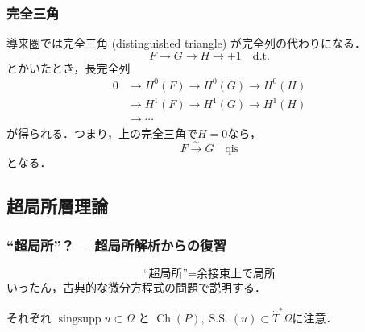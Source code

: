 \documentclass[dvipdfmx,10pt,aspectratio=169,leqno]{beamer}%
\newcommand{\rr}{\mathbf{R}}
\numberwithin{equation}{subsection}
\newcommand{\simarr}{\mathrel{\overset{\sim}{\longrightarrow}}}%
\newcommand{\cotb}[1][]{T^{\ast}{#1}}
\newcommand{\cotz}[1][]{T^{\ast}_{#1}{#1}}
\newcommand{\cotn}[1][]{\dot{T}^{\ast}{#1}}
\theoremstyle{mystyle}
\begin{document}
\begin{frame}
    \frametitle{完全三角}
    導来圏では完全三角 (distinguished triangle) が完全列の代わりになる．
    \[
        F\to G\to H\to+1\quad\mathrm{d.t.}
    \]
    とかいたとき，長完全列
    \begin{align*}
        0&\to H^0(F)\to H^0(G)\to H^0(H)\\
        &\to H^1(F)\to H^1(G)\to H^1(H)\\
        &\to \cdots
    \end{align*}
    が得られる．つまり，上の完全三角で\(H=0\)なら，
    \[
    F\simarr G\quad \mathrm{qis}
    \]となる．
\end{frame}

\subsection{超局所層理論}
\newcommand{\Char}{\mathop{\mathrm{Ch}}\nolimits}
\newcommand{\singsupp}{\mathop{\mathrm{singsupp}}\nolimits}
\newcommand{\SingSpec}{\mathop{\mathrm{S.S.}}\nolimits}

\begin{frame}\frametitle{``超局所''？--- 超局所解析からの復習}
    \[
        \text{``超局所''}=\text{余接束上で局所}
    \]
    いったん，古典的な微分方程式の問題で説明する．
    それぞれ
    \(\singsupp{u}\subset\varOmega\)
    と
    \(\Char(P), \SingSpec(u)\subset \cotn[\varOmega]\)に注意．
\end{frame}
\end{document}
